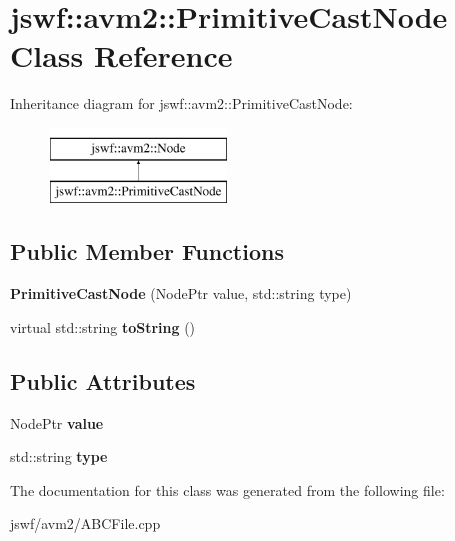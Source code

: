 \hypertarget{classjswf_1_1avm2_1_1_primitive_cast_node}{\section{jswf\+:\+:avm2\+:\+:Primitive\+Cast\+Node Class Reference}
\label{classjswf_1_1avm2_1_1_primitive_cast_node}
}
Inheritance diagram for jswf\+:\+:avm2\+:\+:Primitive\+Cast\+Node\+:\begin{figure}[H]
\begin{center}
\leavevmode
\includegraphics[height=2.000000cm]{classjswf_1_1avm2_1_1_primitive_cast_node}
\end{center}
\end{figure}
\subsection*{Public Member Functions}
\begin{DoxyCompactItemize}
\item 
\hypertarget{classjswf_1_1avm2_1_1_primitive_cast_node_aeb90e030f9e4842d3ac33c5a1d7cef4e}{{\bfseries Primitive\+Cast\+Node} (Node\+Ptr value, std\+::string type)}\label{classjswf_1_1avm2_1_1_primitive_cast_node_aeb90e030f9e4842d3ac33c5a1d7cef4e}

\item 
\hypertarget{classjswf_1_1avm2_1_1_primitive_cast_node_aa13586f6bbac083570cd9e178db49ff6}{virtual std\+::string {\bfseries to\+String} ()}\label{classjswf_1_1avm2_1_1_primitive_cast_node_aa13586f6bbac083570cd9e178db49ff6}

\end{DoxyCompactItemize}
\subsection*{Public Attributes}
\begin{DoxyCompactItemize}
\item 
\hypertarget{classjswf_1_1avm2_1_1_primitive_cast_node_a99a8bd703ec31c983549916805269b5c}{Node\+Ptr {\bfseries value}}\label{classjswf_1_1avm2_1_1_primitive_cast_node_a99a8bd703ec31c983549916805269b5c}

\item 
\hypertarget{classjswf_1_1avm2_1_1_primitive_cast_node_a96c698d0112c880ef18122bf6d64cb1b}{std\+::string {\bfseries type}}\label{classjswf_1_1avm2_1_1_primitive_cast_node_a96c698d0112c880ef18122bf6d64cb1b}

\end{DoxyCompactItemize}


The documentation for this class was generated from the following file\+:\begin{DoxyCompactItemize}
\item 
jswf/avm2/A\+B\+C\+File.\+cpp\end{DoxyCompactItemize}
